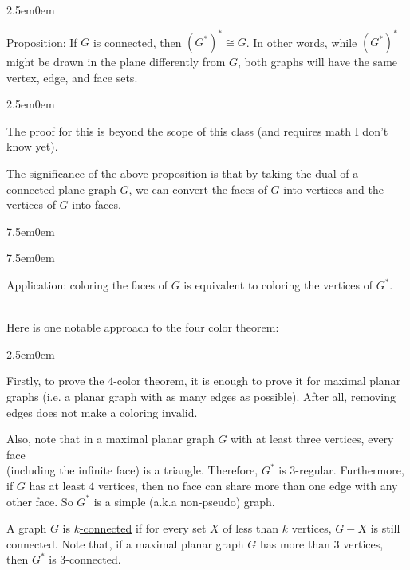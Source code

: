\documentclass{book}
\newcommand{\hTwo}{%
   \color{MidnightBlue}%
   \fontsize{13}{15}\selectfont%
}
\newcommand{\hThree}{%
   \color{PineGreen}
   \fontsize{13}{15}\selectfont%
}
\newcommand{\exOne}{%
   \color{Purple}%
   \fontsize{14}{16}\selectfont%
}
\newenvironment{myIndent}{%
   \begin{adjustwidth}{2.5em}{0em}%
}{%
   \end{adjustwidth}%
}
\newenvironment{myTindent}{%
   \begin{adjustwidth}{7.5em}{0em}%
}{%
   \end{adjustwidth}%
}
\newcommand{\udefine}[1]{{%
   \setulcolor{Red}%
   \setul{0.14em}{0.07em}%
   \ul{#1}%
}}
\newcommand{\uuline}[2][.]{%
{\vphantom{a}\color{#1}%
\rlap{\rule[-0.18em]{\widthof{#2}}{0.06em}}%
\rlap{\rule[-0.32em]{\widthof{#2}}{0.06em}}}%
#2}
\newcommand{\mySepTwo}[1][.]{%
   {\noindent\color{#1}{\rule{6.5in}{0.5mm}}}\\%
}
\newcommand{\retTwo}{\hfill\bigbreak}
\begin{document}
\newpage

{\begin{myIndent} \hTwo
   \uuline{Proposition}: If $G$ is connected, then $(G^*)^* \cong G$. In other words, while $(G^*)^*$ might be drawn in the plane differently from $G$, both graphs will have the same vertex, edge, and face sets.
   
   {\begin{myIndent} \hThree
      The proof for this is beyond the scope of this class (and requires math I don't know yet). \retTwo
   \end{myIndent}}
\end{myIndent}}

The significance of the above proposition is that by taking the dual of a connected plane graph $G$, we can convert the faces of $G$ into vertices and the vertices of $G$ into faces.
{\begin{myTindent}\begin{myTindent} \exOne
   Application: coloring the faces of $G$ is equivalent to coloring the vertices of $G^*$.
\end{myTindent}\end{myTindent}}

\mySepTwo

Here is one notable approach to the four color theorem: \retTwo

{\begin{myIndent}\hTwo
   Firstly, to prove the $4$-color theorem, it is enough to prove it for maximal planar graphs (i.e. a planar graph with as many edges as possible). After all, removing edges does not make a coloring invalid.
   \retTwo

   Also, note that in a maximal planar graph $G$ with at least three vertices, every face\\ (including the infinite face) is a triangle. Therefore, $G^*$ is $3$-regular. Furthermore, if $G$ has at least $4$ vertices, then no face can share more than one edge with any other face. So $G^*$ is a simple (a.k.a non-pseudo) graph.
   \retTwo

   A graph $G$ is \udefine{$k$-connected} if for every set $X$ of less than $k$ vertices, $G - X$ is still connected. Note that, if a maximal planar graph $G$ has more than $3$ vertices, then $G^*$ is $3$-connected. \retTwo
\end{myIndent}}
\end{document}
